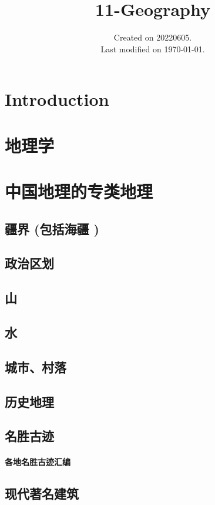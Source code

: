 \documentclass[UTF8]{../RepresentationUniverse}
\begin{document}
\title{11-Geography}
\date{Created on 20220605.\\   Last modified on \today.}
\maketitle
\tableofcontents


\chapter{Introduction}

\chapter{地理学}








\chapter{中国地理的专类地理}
\section{疆界 (包括海疆 )}
\section{政治区划}
\section{山}
\section{水}
\section{城市、村落}
\section{历史地理}
\section{名胜古迹}
    \subsubsection{各地名胜古迹汇编}
\section{现代著名建筑}
\end{document}
